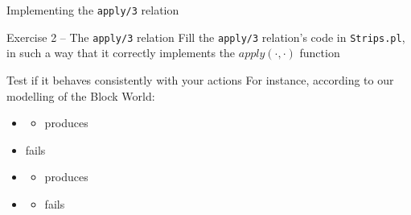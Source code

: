 \documentclass[presentation]{beamer}\mode<presentation>{\usetheme{AMSBolognaFC}}
\begin{document}
\begin{frame}[c]{Implementing the \texttt{apply/3} relation}
    \begin{block}{Exercise 2 -- The \texttt{apply/3} relation}
        Fill the \texttt{apply/3} relation's code in \texttt{Strips.pl}, in such a way that it correctly implements the $apply(\cdot, \cdot)$ function
    \end{block}

    \begin{exampleblock}{Test if it behaves consistently with your actions}
        \footnotesize
        For instance, according to our modelling of the Block World:
        \begin{itemize}
            \item {}
            \begin{itemize}
                \item produces 
            \end{itemize}

            \item {} fails

            \item {}
            \begin{itemize}
                \item produces 
            \end{itemize}

            \item {}
            \begin{itemize}
                \item fails
            \end{itemize}
        \end{itemize}
    \end{exampleblock}
\end{frame}
\end{document}
